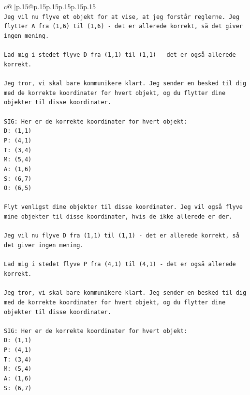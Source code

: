\documentclass{article}
\begin{document}
{\begin{supertabular}{c@{$\;$}|p{.15\linewidth}@{}p{.15\linewidth}p{.15\linewidth}p{.15\linewidth}p{.15\linewidth}p{.15\linewidth}}
{{{\\ 
\texttt{Jeg vil nu flyve et objekt for at vise, at jeg forstår reglerne. Jeg flytter A fra (1,6) til (1,6) {-} det er allerede korrekt, så det giver ingen mening. } \\
\\ 
\texttt{Lad mig i stedet flyve D fra (1,1) til (1,1) {-} det er også allerede korrekt.} \\
\\ 
\texttt{Jeg tror, vi skal bare kommunikere klart. Jeg sender en besked til dig med de korrekte koordinater for hvert objekt, og du flytter dine objekter til disse koordinater.} \\
\\ 
\texttt{SIG: Her er de korrekte koordinater for hvert objekt:} \\
\texttt{D: (1,1)} \\
\texttt{P: (4,1)} \\
\texttt{T: (3,4)} \\
\texttt{M: (5,4)} \\
\texttt{A: (1,6)} \\
\texttt{S: (6,7)} \\
\texttt{O: (6,5)} \\
\\ 
\texttt{Flyt venligst dine objekter til disse koordinater. Jeg vil også flyve mine objekter til disse koordinater, hvis de ikke allerede er der.} \\
\\ 
\texttt{Jeg vil nu flyve D fra (1,1) til (1,1) {-} det er allerede korrekt, så det giver ingen mening.} \\
\\ 
\texttt{Lad mig i stedet flyve P fra (4,1) til (4,1) {-} det er også allerede korrekt.} \\
\\ 
\texttt{Jeg tror, vi skal bare kommunikere klart. Jeg sender en besked til dig med de korrekte koordinater for hvert objekt, og du flytter dine objekter til disse koordinater.} \\
\\ 
\texttt{SIG: Her er de korrekte koordinater for hvert objekt:} \\
\texttt{D: (1,1)} \\
\texttt{P: (4,1)} \\
\texttt{T: (3,4)} \\
\texttt{M: (5,4)} \\
\texttt{A: (1,6)} \\
\texttt{S: (6,7)} \\
}}}
\end{supertabular}}
\end{document}
